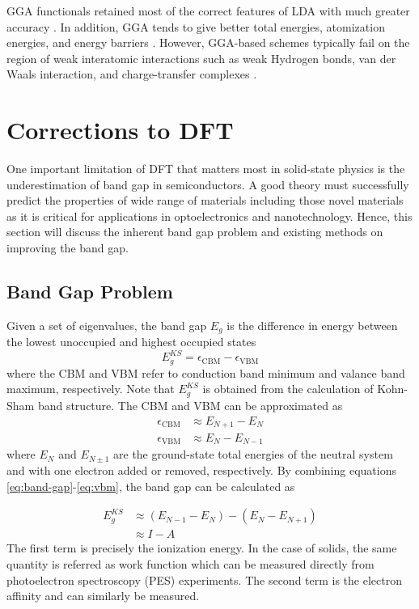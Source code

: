 GGA functionals retained most of the correct features of LDA with much greater accuracy \citep{Burke1997}. In addition, GGA tends to give better total energies, atomization energies, and energy barriers \citep{Becke1988,Langreth1983,Perdew1992a,Proynov1995}. However, GGA-based schemes typically fail on the region of weak interatomic interactions such as weak Hydrogen bonds, van der Waals interaction, and charge-transfer complexes \citep{Kim1994,PerezJorda1995,Ruiz1995}.

\section{Corrections to DFT}
One important limitation of DFT that matters most in solid-state physics is the underestimation of band gap in semiconductors. A good theory must successfully predict the  properties of wide range of materials including those novel materials as it is critical for applications in optoelectronics and nanotechnology. Hence, this section will discuss the inherent band gap problem and existing methods on improving the band gap.   

\subsection{Band Gap Problem}
Given a set of eigenvalues, the band gap $E_g$ is the difference in energy between the lowest unoccupied and highest occupied states
\begin{equation} \label{eq:band-gap}
	E_g^{KS} = \epsilon_{\text{CBM}} - \epsilon_{\text{VBM}}
\end{equation}
where the CBM and VBM refer to conduction band minimum and valance band maximum, respectively. Note that $E_g^{KS}$ is obtained from the calculation of Kohn-Sham band structure. The CBM and VBM can be approximated as 
\begin{align}
	\epsilon_{\text{CBM}} &\approx E_{N + 1} - E_{N} \label{eq:cbm}	\\
	\epsilon_{\text{VBM}} &\approx E_{N} - E_{N - 1}	\label{eq:vbm}
\end{align}
where $E_{N}$ and $E_{N \pm 1}$ are the ground-state total energies of the neutral system and with one electron added or removed, respectively. By combining equations \eqref{eq:band-gap}-\eqref{eq:vbm}, the band gap can be calculated as \citep{MoriSanchez2008}

\begin{align} \label{eq:band-gap1}
	E_g^{KS} &\approx (E_{N - 1} - E_{N} )  - (E_{N} - E_{N + 1}) \\
	&\approx I - A \nonumber
\end{align}
The first term is precisely the ionization energy. In the case of solids, the same quantity is referred as work function which can be measured directly from photoelectron spectroscopy (PES) experiments. The second term is the electron affinity and can similarly be measured. 

